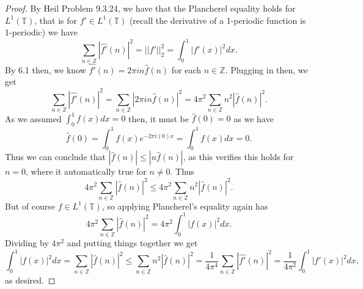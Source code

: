 \documentclass[12pt]{article}
\newenvironment{ex}[2][Exercise]{\begin{trivlist}
\item[\hskip \labelsep {\bfseries #1}\hskip \labelsep {\bfseries #2.}]}{\end{trivlist}}
\begin{document}
\begin{ex}{6}
\begin{enumerate}[label=6.\arabic*]
\begin{proof}
            By Heil Problem 9.3.24, we have that the Plancherel equality holds for $L^1(\mathbb{T})$, that is for $f' \in L^1(\mathbb{T})$ (recall the derivative of a 1-periodic function is 1-periodic) we have 
            $$\sum_{n \in \mathbb{Z}} |\hat{f'}(n)|^2 = ||f'||_2^2 = \int_0^1 |f'(x)|^2 dx.$$
            By 6.1 then, we know $\hat{f'}(n) = 2\pi in\hat{f}(n)$ for each $n \in \mathbb{Z}$. Plugging in then, we get 
            $$\sum_{n \in \mathbb{Z}} |\hat{f'}(n)|^2 = \sum_{n \in \mathbb{Z}} |2\pi in\hat{f}(n)|^2 = 4\pi^2 \sum_{n \in \mathbb{Z}} n^2|\hat{f}(n)|^2.$$
            As we assumed $\int_0^1 f(x) dx = 0$ then, it must be $\hat{f}(0) = 0$ as we have 
            $$\hat{f}(0) = \int_0^1 f(x)e^{-2\pi i(0)x} = \int_0^1 f(x) dx = 0.$$
            Thus we can conclude that $|\hat{f}(n) | \leq |n\hat{f}(n)|$, as this verifies this holds for $n = 0$, where it automatically true for $n \neq 0$. Thus 
            $$4\pi^2 \sum_{n \in \mathbb{Z}} |\hat{f}(n)|^2 \leq 4\pi^2 \sum_{n \in \mathbb{Z}} n^2|\hat{f}(n)|^2.$$
            But of course $f \in L^1(\mathbb{T})$, so applying Plancherel's equality again has 
            $$4\pi^2 \sum_{n \in \mathbb{Z}} |\hat{f}(n)|^2 = 4\pi^2 \int_0^1 |f(x)|^2 dx.$$
            Dividing by $4\pi^2$ and putting things together we get
            $$\int_0^1 |f(x)|^2 dx = \sum_{n \in \mathbb{Z}} |\hat{f}(n)|^2 \leq \sum_{n \in \mathbb{Z}} n^2|\hat{f}(n)|^2 = \frac{1}{4\pi^4} \sum_{n \in \mathbb{Z}} |\hat{f'}(n)|^2 = \frac{1}{4\pi^2} \int_0^1 |f'(x)|^2 dx,$$
            as desired.
        \end{proof}
    \end{enumerate}
\end{ex}
\end{document}
